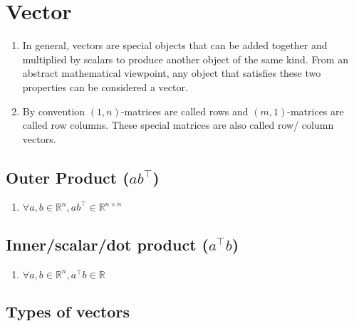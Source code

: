 \section{Vector}

\begin{enumerate}
    \item In general, vectors are special objects that can be added together and multiplied by scalars to produce another object of the same kind. From an abstract mathematical viewpoint, any object that satisfies these two properties can be considered a vector. 
    \hfill \cite{mfml/book/mml/Deisenroth-Faisal-Ong}

    \item By convention $(1, n)$-matrices are called rows and $(m, 1)$-matrices are called row columns. These special matrices are also called row/ column vectors.
    \hfill \cite{mfml/book/mml/Deisenroth-Faisal-Ong}

    
\end{enumerate}


\subsection{Outer Product ($ab^\top$) }

\begin{enumerate}
    \item $\forall a,b \in \mathbb{R}^n, ab^\top \in \mathbb{R}^{n\times n}$
    \hfill \cite{mfml/book/mml/Deisenroth-Faisal-Ong}
    
\end{enumerate}



\subsection{Inner/scalar/dot product ($a^\top b$)}


\begin{enumerate}
    \item $\forall a,b \in \mathbb{R}^n, a^\top b \in \mathbb{R}$
    \hfill \cite{mfml/book/mml/Deisenroth-Faisal-Ong}
    
\end{enumerate}



\subsection{Types of vectors}


